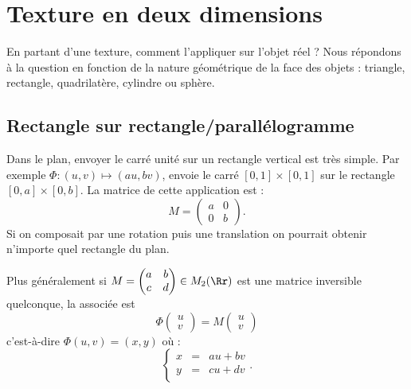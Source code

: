 \documentclass[11pt,class=report,crop=false]{standalone}
\begin{document}
\section{Texture en deux dimensions}

En partant d'une texture, comment l'appliquer sur l'objet réel ? Nous répondons à la question en fonction de la nature géométrique de la face des objets : triangle, rectangle, quadrilatère, cylindre ou sphère.


\subsection{Rectangle sur rectangle/parallélogramme}

Dans le plan, envoyer le carré unité sur un rectangle vertical est très simple. Par exemple $\Phi : (u,v) \mapsto (au,bv)$, envoie le carré $[0,1] \times [0,1]$ sur le rectangle $[0,a] \times [0,b]$. La matrice de cette application est :
$$M = \begin{pmatrix} a & 0 \\ 0 & b \end{pmatrix}.$$
Si on composait par une rotation puis une translation on pourrait obtenir n'importe quel rectangle du plan.


\medskip

Plus généralement si $M = \begin{pmatrix} a & b \\ c & d \end{pmatrix}\in M_2(\Rr)$ est une matrice inversible quelconque, la  associée est
$$\Phi \begin{pmatrix} u \\ v \end{pmatrix} = M \begin{pmatrix} u \\ v \end{pmatrix}$$
c'est-à-dire $\Phi(u,v)= (x,y)$ où :
$$\left\{
\begin{array}{rcl}
	x &=& au+bv \\
	y &=& cu+dv \\
\end{array}	
\right..$$
\end{document}

